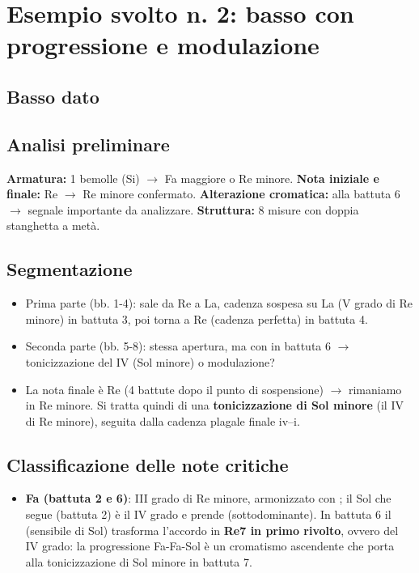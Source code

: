 \section{Esempio svolto n. 2: basso con progressione e modulazione}
\label{sec:esempio2}

\subsection{Basso dato}

\subsection{Analisi preliminare}

\textbf{Armatura:} 1 bemolle (Si\bemolle{}) $\rightarrow$ Fa maggiore o Re minore.
\textbf{Nota iniziale e finale:} Re $\rightarrow$ Re minore confermato.
\textbf{Alterazione cromatica:} \Fadiesis{} alla battuta 6 $\rightarrow$ segnale importante da analizzare.
\textbf{Struttura:} 8 misure con doppia stanghetta a metà.

\subsection{Segmentazione}

\begin{itemize}
	\item Prima parte (bb. 1-4): sale da Re a La, cadenza sospesa su La (V grado di Re minore) in battuta 3, poi torna a Re (cadenza perfetta) in battuta 4.
	\item Seconda parte (bb. 5-8): stessa apertura, ma con \Fadiesis{} in battuta 6 $\rightarrow$ tonicizzazione del IV (Sol minore) o modulazione?
	\item La nota finale è Re (4 battute dopo il punto di sospensione) $\rightarrow$ rimaniamo in Re minore. Si tratta quindi di una \textbf{tonicizzazione di Sol minore} (il IV di Re minore), seguita dalla cadenza plagale finale iv--i.
\end{itemize}

\subsection{Classificazione delle note critiche}

\begin{itemize}
	\item \textbf{Fa (battuta 2 e 6)}: III grado di Re minore, armonizzato con ; il Sol che segue (battuta 2) è il IV grado e prende  (sottodominante). In battuta 6 il \Fadiesis{} (sensibile di Sol) trasforma l'accordo in \textbf{Re7 in primo rivolto}, ovvero  del IV grado: la progressione Fa-Fa\diesis{}-Sol è un cromatismo ascendente che porta alla tonicizzazione di Sol minore in battuta 7.
\end{itemize}

